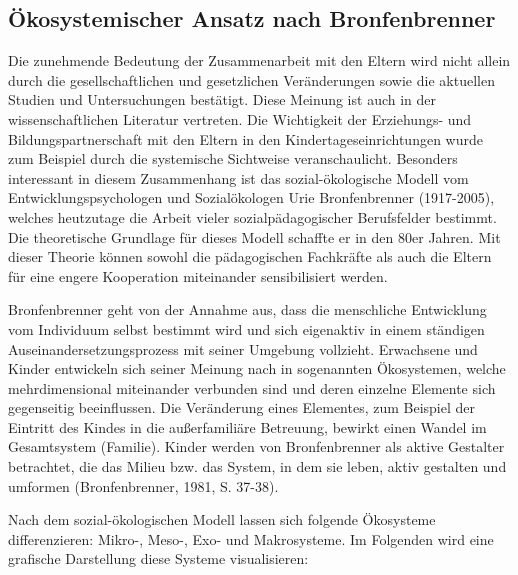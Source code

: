 \documentclass[12pt,a4paper]{article}
\begin{document}
\subsection{Ökosystemischer Ansatz nach Bronfenbrenner} 

Die zunehmende Bedeutung der Zusammenarbeit mit den Eltern wird nicht allein durch die gesellschaftlichen und gesetzlichen Veränderungen sowie die aktuellen Studien und Untersuchungen bestätigt. Diese Meinung ist auch in der wissenschaftlichen Literatur vertreten. Die Wichtigkeit der Erziehungs- und Bildungspartnerschaft mit den Eltern in den Kindertageseinrichtungen wurde zum Beispiel durch die systemische Sichtweise veranschaulicht. Besonders interessant in diesem Zusammenhang ist das sozial-ökologische Modell vom Entwicklungspsychologen und Sozialökologen Urie Bronfenbrenner (1917-2005), welches heutzutage die Arbeit vieler sozialpädagogischer Berufsfelder bestimmt. Die theoretische Grundlage für dieses Modell schaffte er in den 80er Jahren. Mit dieser Theorie können sowohl die pädagogischen Fachkräfte als auch die Eltern für eine engere Kooperation miteinander sensibilisiert werden. 

	Bronfenbrenner geht von der Annahme aus, dass die menschliche Entwicklung vom Individuum selbst bestimmt wird und sich eigenaktiv in einem ständigen Auseinandersetzungsprozess mit seiner Umgebung vollzieht. Erwachsene und Kinder entwickeln sich seiner Meinung nach in sogenannten Ökosystemen, welche mehrdimensional miteinander verbunden sind und deren einzelne Elemente sich gegenseitig beeinflussen. Die Veränderung eines Elementes, zum Beispiel der Eintritt des Kindes in die außerfamiliäre Betreuung, bewirkt einen Wandel im Gesamtsystem (Familie). Kinder werden von Bronfenbrenner als aktive Gestalter betrachtet, die das Milieu bzw. das System, in dem sie leben, aktiv gestalten und umformen (Bronfenbrenner, 1981, S. 37-38). 
	
Nach dem sozial-ökologischen Modell lassen sich folgende Ökosysteme differenzieren: Mikro-, Meso-, Exo- und Makrosysteme. Im Folgenden wird eine grafische Darstellung diese Systeme visualisieren:
\end{document}
